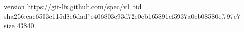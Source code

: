 version https://git-lfs.github.com/spec/v1
oid sha256:eae6503c115d8e6dad7e406803c93d72e0eb165891cf5937a0cb08580ef797e7
size 43840
